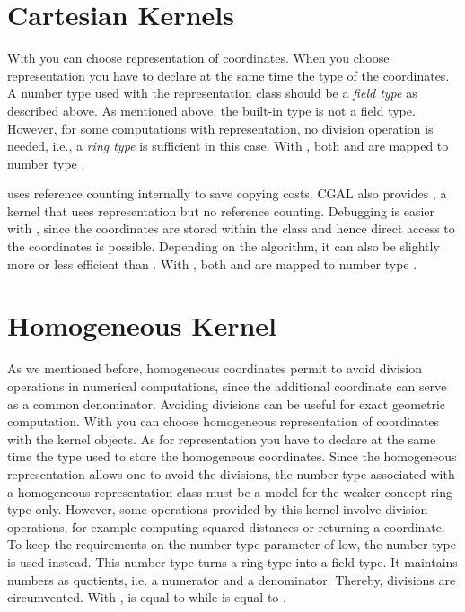 \section{Cartesian Kernels}
With  you can choose  representation 
of coordinates. When you choose  representation you 
have to declare at the same time the type of the coordinates.
A number type used with the  representation class
should be a {\em field type} as described above.
As mentioned above, the built-in type  is not a field type.
However, for some computations with   representation, no 
division operation is needed, i.e., 
a {\em ring type} is sufficient in this case.
With , both 
and  are mapped to number type .

 uses reference counting internally to save copying
costs. CGAL also provides , a kernel
that uses  representation but no reference counting. 
Debugging is easier with , since the coordinates
are stored within the class and hence direct access to the coordinates is
possible.  Depending on the algorithm, it can also be slightly more or less
efficient than .
With , both 
and  are mapped to number type .

\section{Homogeneous Kernel}
As we mentioned before, homogeneous coordinates permit to avoid 
division operations in numerical computations, since the additional 
coordinate can serve as a common denominator. 
Avoiding divisions can be useful for exact geometric computation. 
With  you can choose homogeneous representation 
of coordinates with the kernel objects. As for  representation you 
have to declare at the same time the type used to store the homogeneous
coordinates. Since the homogeneous representation allows one to avoid the
divisions, the number type associated with a homogeneous representation class
must be a model for the weaker concept ring type only. However,
some operations provided by this kernel involve division operations, for
example computing squared distances or returning a  coordinate.
To keep the requirements on the number type parameter of 
low, the number type  is used instead.
This number type turns a ring type into a field type. It maintains
numbers as quotients, i.e. a numerator and a denominator. 
Thereby, divisions are circumvented.
With ,  is
equal to  while 
 is equal to .

